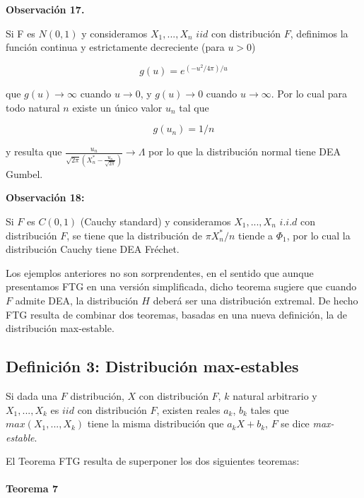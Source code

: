\documentclass[
  oneside]{book}
\begin{document}
\textbf{Observación 17.}

Si F es \(N(0,1)\) y consideramos \(X_1,...,X_n\) \(iid\) con
distribución \(F\), definimos la función continua y estrictamente
decreciente (para \(u>0\))

\[
g(u)=e^{(-u^2/4\pi)/u}
\]

que \(g(u)\rightarrow \infty\) cuando \(u\rightarrow 0\), y
\(g(u)\rightarrow 0\) cuando \(u\rightarrow \infty\). Por lo cual para
todo natural \(n\) existe un único valor \(u_n\) tal que

\[
g(u_n)=1/n
\]

y resulta que
\(\frac{u_n}{\sqrt{2\pi}\left (X_n^*-\frac{u_n}{\sqrt{2\pi}}\right )}\longrightarrow \Lambda\)
por lo que la distribución normal tiene DEA Gumbel.

\textbf{Observación 18:}

Si \(F\) es \(C(0,1)\) (Cauchy standard) y consideramos \(X_1,...,X_n\)
\(i.i.d\) con distribución \(F\), se tiene que la distribución de
\(\pi X^*_n/n\) tiende a \(\Phi_1\), por lo cual la distribución Cauchy
tiene DEA Fréchet.

Los ejemplos anteriores no son sorprendentes, en el sentido que aunque
presentamos FTG en una versión simplificada, dicho teorema sugiere que
cuando \(F\) admite DEA, la distribución \(H\) deberá ser una
distribución extremal. De hecho FTG resulta de combinar dos teoremas,
basadas en una nueva definición, la de distribución max-estable.

\hypertarget{definiciuxf3n-3-distribuciuxf3n-max-estables}{%
\subsection{Definición 3: Distribución
max-estables}\label{definiciuxf3n-3-distribuciuxf3n-max-estables}}

Si dada una \(F\) distribución, \(X\) con distribución \(F\), \(k\)
natural arbitrario y \(X_1,...,X_k\) es \(iid\) con distribución \(F\),
existen reales \(a_k\), \(b_k\) tales que \(max(X_1,...,X_k)\) tiene la
misma distribución que \(a_k X+ b_k\), \(F\) se dice
\textit{max-estable}.

El Teorema FTG resulta de superponer los dos siguientes teoremas:

\hypertarget{teorema-7}{%
\paragraph{Teorema 7}\label{teorema-7}}
\end{document}
